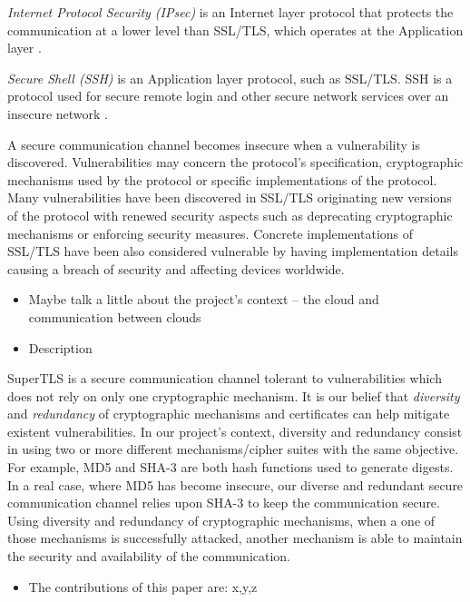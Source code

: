 \documentclass{sig-alternate-05-2015}
\begin{document}
\textit{Internet Protocol Security (IPsec)} is an Internet layer protocol that protects the communication at a lower level than SSL/TLS, which operates at the Application layer \cite{IPsec}.

\textit{Secure Shell (SSH)} is an Application layer protocol, such as SSL/TLS. SSH is a protocol used for secure remote login and other secure network services over an insecure network \cite{SSH}.

A secure communication channel becomes insecure when a vulnerability is discovered. Vulnerabilities may concern the protocol's specification, cryptographic mechanisms used by the protocol or specific implementations of the protocol. Many vulnerabilities have been discovered in SSL/TLS originating new versions of the protocol with renewed security aspects such as deprecating cryptographic mechanisms or enforcing security measures.
Concrete implementations of SSL/TLS have been also considered vulnerable by having implementation details causing a breach of security and affecting devices worldwide.

\begin{itemize}
	\item Maybe talk a little about the project's context -- the cloud and communication between clouds
\end{itemize}

\begin{itemize}
	\item {Description}
\end{itemize}

SuperTLS is a secure communication channel tolerant to vulnerabilities which does not rely on only one cryptographic mechanism. It is our belief that \textit{diversity} and \textit{redundancy} of cryptographic mechanisms and certificates can help mitigate existent vulnerabilities.
In our project's context, diversity and redundancy consist in using two or more different mechanisms/cipher suites with the same objective. For example, MD5 and SHA-3 are both hash functions used to generate digests. In a real case, where MD5 has become insecure, our diverse and redundant secure communication channel relies upon SHA-3 to keep the communication secure. Using diversity and redundancy of cryptographic mechanisms, when a one of those mechanisms is successfully attacked, another mechanism is able to maintain the security and availability of the communication.

\begin{itemize}
	\item The contributions of this paper are: x,y,z
\end{itemize}
\end{document}
